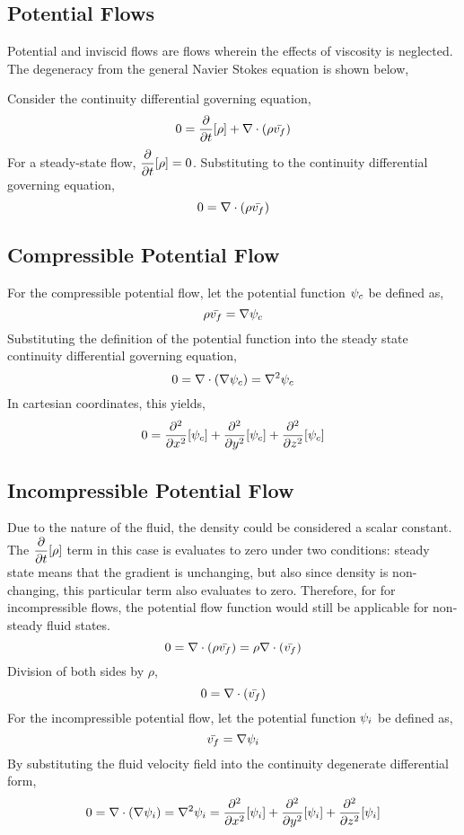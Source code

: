 \documentclass[a4paper, 12pt]{report}
\begin{document}
\begin{center}
\chapter{Potential Flows}
\begin{comment}
\end{comment}
Potential and inviscid flows are flows wherein the effects of viscosity is neglected. The degeneracy from the general Navier Stokes equation is shown below,

Consider the continuity differential governing equation,
$$0 = \frac{\partial}{\partial t}[\rho] +  \nabla \cdot (\rho\bar{v_f})$$
For a steady-state flow, $\displaystyle{\frac{\partial}{\partial t}[\rho] = 0}$. Substituting to the continuity differential governing equation,
$$0 = \nabla \cdot (\rho\bar{v_f})$$
\section{Compressible Potential Flow}
\begin{comment}
\end{comment}
For the compressible potential flow, let the potential function $\displaystyle{\psi_c}$ be defined as,
$$\rho\bar{v_f} = \nabla \psi_c$$
Substituting the definition of the potential function into the steady state continuity differential governing equation,
$$0 = \nabla \cdot (\nabla \psi_c) = \nabla^2\psi_c$$
In cartesian coordinates, this yields,
$$0 = \frac{\partial^2}{\partial x^2}[\psi_c] + \frac{\partial^2}{\partial y^2}[\psi_c] + \frac{\partial^2}{\partial z^2}[\psi_c]$$
\section{Incompressible Potential Flow}
\begin{comment}
\end{comment}
Due to the nature of the fluid, the density could be considered a scalar constant. The $\displaystyle{\frac{\partial}{\partial t}[\rho]}$ term in this case is evaluates to zero under two conditions: steady state means that the gradient is unchanging, but also since density is non-changing, this particular term also evaluates to zero. Therefore, for for incompressible flows, the potential flow function would still be applicable for non-steady fluid states.
$$0 = \nabla \cdot (\rho\bar{v_f}) = \rho\nabla \cdot (\bar{v_f})$$
Division of both sides by $\rho$,
$$0 = \nabla \cdot (\bar{v_f})$$
For the incompressible potential flow, let the potential function $\displaystyle{\psi_i}$ be defined as,
$$\bar{v_f} = \nabla \psi_i$$
By substituting the fluid velocity field into the continuity degenerate differential form,
$$0 = \nabla \cdot (\nabla \psi_i) = \nabla^2\psi_i = \frac{\partial^2}{\partial x^2}[\psi_i] + \frac{\partial^2}{\partial y^2}[\psi_i] + \frac{\partial^2}{\partial z^2}[\psi_i]$$
\end{center}
\end{document}
